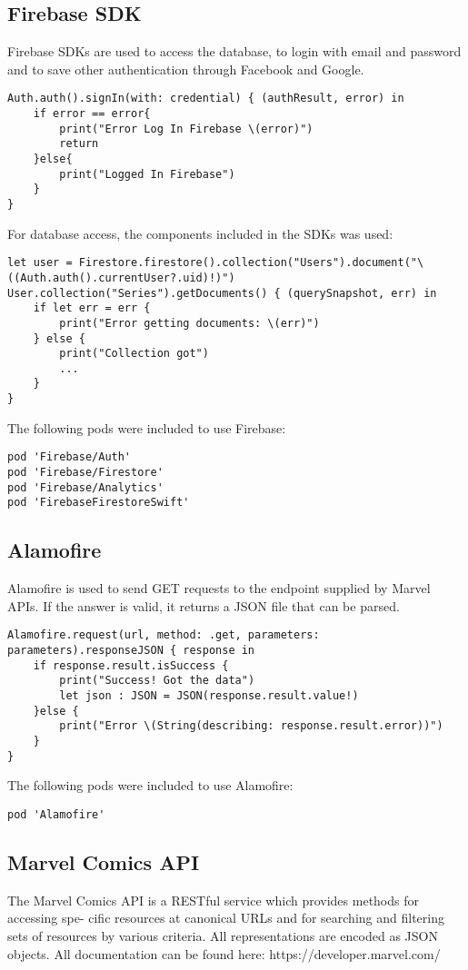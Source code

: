 \clearpage
    
    
\subsection{Firebase SDK}
Firebase SDKs are used to access the database, to login with email and password and to save other authentication through Facebook and Google.
\begin{lstlisting}
Auth.auth().signIn(with: credential) { (authResult, error) in
	if error == error{
		print("Error Log In Firebase \(error)")
		return
	}else{
		print("Logged In Firebase")
	}
}
\end{lstlisting}

For database access, the components included in the SDKs was used:
\begin{lstlisting}
let user = Firestore.firestore().collection("Users").document("\((Auth.auth().currentUser?.uid)!)")
User.collection("Series").getDocuments() { (querySnapshot, err) in
	if let err = err {
		print("Error getting documents: \(err)")
	} else {
		print("Collection got")
		...
	}
}
\end{lstlisting}

The following pods were included to use Firebase:
\begin{lstlisting}
pod 'Firebase/Auth'
pod 'Firebase/Firestore'
pod 'Firebase/Analytics'
pod 'FirebaseFirestoreSwift'
\end{lstlisting}


\clearpage

\subsection{Alamofire}
Alamofire is used to send GET requests to the endpoint supplied by Marvel APIs. If the answer is valid, it returns a JSON file that can be parsed.
\begin{lstlisting}
Alamofire.request(url, method: .get, parameters: parameters).responseJSON { response in
	if response.result.isSuccess {
		print("Success! Got the data")
		let json : JSON = JSON(response.result.value!)
	}else {
		print("Error \(String(describing: response.result.error))")
	}
}
\end{lstlisting}
The following pods were included to use Alamofire:
\begin{lstlisting}
pod 'Alamofire'
\end{lstlisting}

\clearpage

\subsection{Marvel Comics API}
The Marvel Comics API is a RESTful service which provides methods for accessing spe- cific resources at canonical URLs and for searching and filtering sets of resources by various criteria. All representations are encoded as JSON objects. All documentation can be found here: https://developer.marvel.com/

